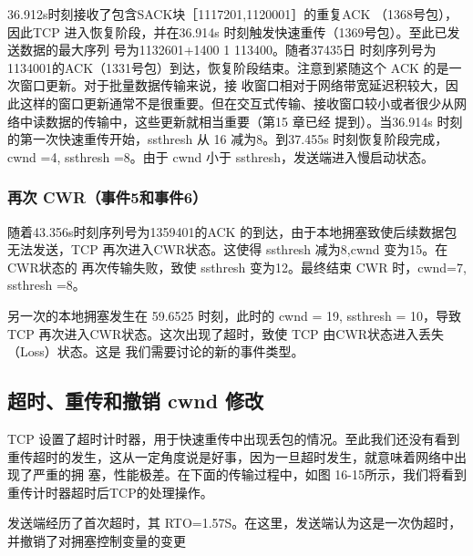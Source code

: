36.912s时刻接收了包含SACK块［1117201,1120001］的重复ACK （1368号包），因此TCP 进入恢复阶段，并在36.914s 时刻触发快速重传（1369号包）。至此已发送数据的最大序列
号为1132601+1400 1 113400。随者37435日 时刻序列号为 1134001的ACK（1331号包）到达，恢复阶段结束。注意到紧随这个 ACK 的是一次窗口更新。对于批量数据传输来说，接
收窗口相对于网络带宽延迟积较大，因此这样的窗口更新通常不是很重要。但在交互式传输、接收窗口较小或者很少从网络中读数据的传输中，这些更新就相当重要（第15 章已经
提到）。当36.914s 时刻的第一次快速重传开始，ssthresh 从 16 减为8。到37.455s 时刻恢复阶段完成，cwnd =4, ssthresh =8。由于 cwnd 小于 ssthresh，发送端进入慢启动状态。

\subsubsection{再次 CWR（事件5和事件6）}
随着43.356s时刻序列号为1359401的ACK 的到达，由于本地拥塞致使后续数据包无法发送，TCP 再次进入CWR状态。这使得 ssthresh 减为8,cwnd 变为15。在CWR状态的
再次传输失败，致使 ssthresh 变为12。最终结束 CWR 时，cwnd=7, ssthresh =8。

另一次的本地拥塞发生在 59.6525 时刻，此时的 cwnd = 19, ssthresh = 10，导致 TCP 再次进入CWR状态。这次出现了超时，致使 TCP 由CWR状态进入丢失（Loss）状态。这是
我们需要讨论的新的事件类型。

\subsection{超时、重传和撤销 cwnd 修改}
TCP 设置了超时计时器，用于快速重传中出现丢包的情况。至此我们还没有看到重传超时的发生，这从一定角度说是好事，因为一旦超时发生，就意味着网络中出现了严重的拥
塞，性能极差。在下面的传输过程中，如图 16-15所示，我们将看到重传计时器超时后TCP的处理操作。

发送端经历了首次超时，其 RTO=1.57S。在这里，发送端认为这是一次伪超时，并撤销了对拥塞控制变量的变更

